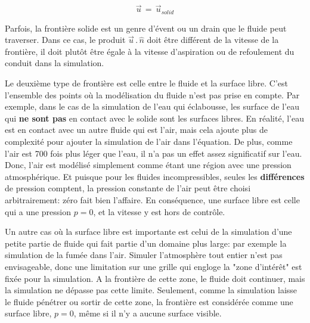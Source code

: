 \documentclass[11pt]{report}
\begin{document}
\begin{equation}
\overrightarrow{u} \,=\, \overrightarrow{u}\!\!_{solid}
\end{equation}

Parfois, la frontière solide est un genre d'évent ou un drain que le fluide peut traverser. Dans ce cas, le produit $ \overrightarrow{u}\,.\,\hat{n} $ doit être différent de la vitesse de la frontière, il doit plutôt être égale à la vitesse d'aspiration ou de refoulement du conduit dans la simulation.\newline


Le deuxième type de frontière est celle entre le fluide et la surface libre. C'est l'ensemble des points où la modélisation du fluide n'est pas prise en compte. Par exemple, dans le cas de la simulation de l'eau qui éclabousse, les surface de l'eau qui \textbf{ne sont pas} en contact avec le solide sont les surfaces libres. En réalité, l'eau est en contact avec un autre fluide qui est l'air, mais cela ajoute plus de complexité  pour ajouter la simulation de l'air dans l'équation. De plus, comme l'air est 700 fois plus léger que l'eau, il n'a pas un effet assez significatif sur l'eau. Donc, l'air est modélisé simplement comme étant une région avec une pression atmosphérique. Et puisque pour les fluides incompressibles, seules les \textbf{ différences} de pression comptent, la pression constante de l'air peut être choisi arbitrairement: zéro fait bien l'affaire. En conséquence, une surface libre est celle qui a une pression $ p = 0 $, et la vitesse y est hors de contrôle.\newline

Un autre cas où la surface libre est importante est celui de la simulation d'une petite partie de fluide qui fait partie d'un domaine plus large: par exemple la simulation de la fumée dans l'air. Simuler l'atmosphère tout entier n'est pas envisageable, donc une limitation sur une grille qui engloge la "zone d'intérêt" est fixée pour la simulation. A la frontière de cette zone, le fluide doit continuer, mais la simulation ne dépasse pas cette limite. Seulement, comme la simulation laisse le fluide pénétrer ou sortir de cette zone, la frontière est considérée comme une surface libre, $ p = 0 $, même si il n'y a aucune surface visible.\newline
\end{document}
